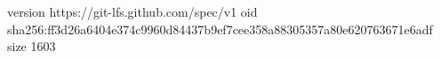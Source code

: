 version https://git-lfs.github.com/spec/v1
oid sha256:ff3d26a6404e374c9960d84437b9ef7cee358a88305357a80e620763671e6adf
size 1603
